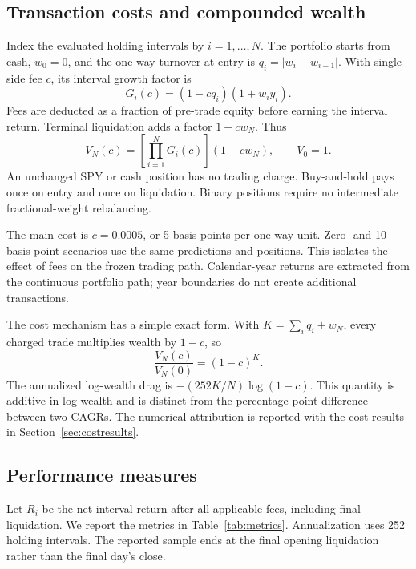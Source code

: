 \subsection{Transaction costs and compounded wealth}
Index the evaluated holding intervals by $i=1,\ldots,N$. The portfolio starts from cash, $w_0=0$, and the one-way turnover at entry is $q_i=|w_i-w_{i-1}|$. With single-side fee $c$, its interval growth factor is
\begin{equation}
G_i(c)=(1-cq_i)(1+w_i y_i).
\label{eq:growth}
\end{equation}
Fees are deducted as a fraction of pre-trade equity before earning the interval return. Terminal liquidation adds a factor $1-cw_N$. Thus
\begin{equation}
V_N(c)=\left[\prod_{i=1}^N G_i(c)\right](1-cw_N),\qquad V_0=1.
\label{eq:wealth}
\end{equation}
An unchanged SPY or cash position has no trading charge. Buy-and-hold pays once on entry and once on liquidation. Binary positions require no intermediate fractional-weight rebalancing.

The main cost is $c=0.0005$, or 5 basis points per one-way unit. Zero- and 10-basis-point scenarios use the same predictions and positions. This isolates the effect of fees on the frozen trading path. Calendar-year returns are extracted from the continuous portfolio path; year boundaries do not create additional transactions.

The cost mechanism has a simple exact form. With $K=\sum_iq_i+w_N$, every charged trade multiplies wealth by $1-c$, so
\begin{equation}
\frac{V_N(c)}{V_N(0)}=(1-c)^K.
\label{eq:drag}
\end{equation}
The annualized log-wealth drag is $-(252K/N)\log(1-c)$. This quantity is additive in log wealth and is distinct from the percentage-point difference between two CAGRs. The numerical attribution is reported with the cost results in Section~\ref{sec:costresults}.

\subsection{Performance measures}
Let $R_i$ be the net interval return after all applicable fees, including final liquidation. We report the metrics in Table~\ref{tab:metrics}. Annualization uses 252 holding intervals. The reported sample ends at the final opening liquidation rather than the final day's close.

